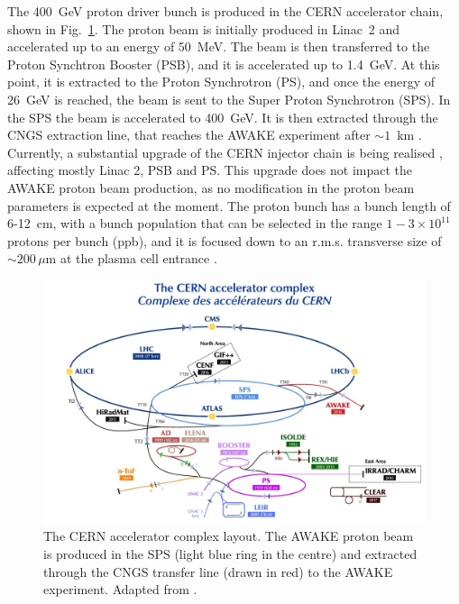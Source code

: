 The 400~GeV proton driver bunch is produced in the CERN accelerator chain, shown in Fig.~\ref{fig:cern_injectors}. The proton beam is initially produced in Linac~2 and accelerated up to an energy of 50~MeV. The beam is then transferred to the Proton Synchtron Booster (PSB), and it is accelerated up to 1.4~GeV. At this point, it is extracted to the Proton Synchrotron (PS), and once the energy of 26~GeV is reached, the beam is sent to the Super Proton Synchrotron (SPS). In the SPS the beam is accelerated to 400~GeV. It is then extracted through the CNGS extraction line, that reaches the AWAKE experiment after $\sim 1$~km \cite{Elsener:530678}. Currently, a substantial upgrade of the CERN injector chain is being realised \cite{LIU}, affecting mostly Linac 2, PSB and PS. This upgrade does not impact the AWAKE proton beam production, as no modification in the proton beam parameters is expected at the moment. The proton bunch has a bunch length of 6-12~cm, with a bunch population that can be selected in the range $1-3\times10^{11}$ protons per bunch (ppb), and it is focused down to an r.m.s. transverse size of $\sim 200\,\mu$m at the plasma cell entrance \cite{Adli:2018end}. 

\begin{figure}[!bh]
\centering
\includegraphics[width=14cm, keepaspectratio]{pictures/cern_complex}
\caption{The CERN accelerator complex layout. The AWAKE proton beam is produced in the SPS (light blue ring in the centre) and extracted through the CNGS transfer line (drawn in red) to the AWAKE experiment. Adapted from  \cite{cern_acc_complex_layout}.}
\label{fig:cern_injectors}
\end{figure}

